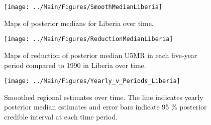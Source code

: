 \documentclass[12pt]{article}\usepackage[]{graphicx}\usepackage[]{color}
\newenvironment{knitrout}{}{} %
\begin{document}
\begin{knitrout}
\color{fgcolor}\begin{figure}[bht]

{\centering \texttt{[image: ../Main/Figures/SmoothMedianLiberia]} 

}

\caption[Maps of posterior medians for Liberia  over time]{Maps of posterior medians for Liberia  over time.}\label{fig:unnamed-chunk-184}
\end{figure}


\end{knitrout}
\begin{knitrout}
\color{fgcolor}\begin{figure}[bht]

{\centering \texttt{[image: ../Main/Figures/ReductionMedianLiberia]} 

}

\caption[Maps of reduction of posterior median U5MR in each five-year period compared to 1990 in Liberia over time]{Maps of reduction of posterior median U5MR in each five-year period compared to 1990 in Liberia over time.}\label{fig:unnamed-chunk-185}
\end{figure}


\end{knitrout}
\begin{knitrout}
\color{fgcolor}\begin{figure}[bht]

{\centering \texttt{[image: ../Main/Figures/Yearly\_v\_Periods\_Liberia]} 

}

\caption[Smoothed regional estimates over time]{Smoothed regional estimates over time. The line indicates yearly posterior median estimates and error bars indicate 95 \% posterior credible interval at each time period.}\label{fig:unnamed-chunk-186}
\end{figure}


\end{knitrout}
\end{document}
